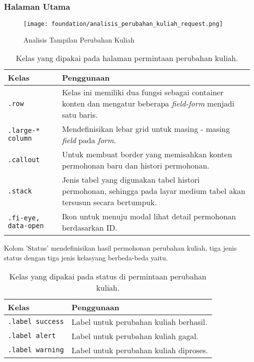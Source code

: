 \subsubsection{Halaman Utama}
\begin{figure} [H]
	\centering  
	\texttt{[image: foundation/analisis\_perubahan\_kuliah\_request.png]}
	\caption{Analisis Tampilan Perubahan Kuliah}
\end{figure}
\begin{table}[H]
	\centering
	\begin{tabularx}{\textwidth}{lX}
		\toprule
		Kelas     & Penggunaan \\
		\midrule
		 \texttt{.row} & Kelas ini memiliki dua fungsi sebagai container konten dan mengatur beberapa \textit{field-form} menjadi satu baris. \\
		 \texttt{.large-* column} & Mendefinisikan lebar grid untuk masing - masing \textit{field} pada \textit{form}. \\
		 \texttt{.callout} & Untuk membuat border yang memisahkan konten permohonan baru dan histori permohonan.\\
		 \texttt{.stack} & Jenis tabel yang digunakan tabel histori permohonan, sehingga pada layar medium tabel akan tersusun secara bertumpuk.\\
		 \texttt{.fi-eye, data-open} & Ikon untuk menuju modal lihat detail permohonan berdasarkan ID.\\
		\bottomrule
	\end{tabularx}%
	\caption{Kelas yang dipakai pada halaman permintaan perubahan kuliah.}
\end{table}

Kolom 'Status' mendefinisikan hasil permohonan perubahan kuliah, tiga jenis status dengan tiga jenis kelasyang berbeda-beda yaitu.\\

\begin{table}[H]
	\centering
	\begin{tabularx}{\textwidth}{lX}
		\toprule
		Kelas     & Penggunaan \\
		\midrule
		 \texttt{.label success} & Label untuk perubahan kuliah berhasil.\\
		 \texttt{.label alert} & Label untuk perubahan kuliah gagal.\\
		 \texttt{.label warning} & Label untuk perubahan kuliah diproses.\\
		\bottomrule
	\end{tabularx}%
	\caption{Kelas yang dipakai pada status di permintaan perubahan kuliah.}
\end{table}

